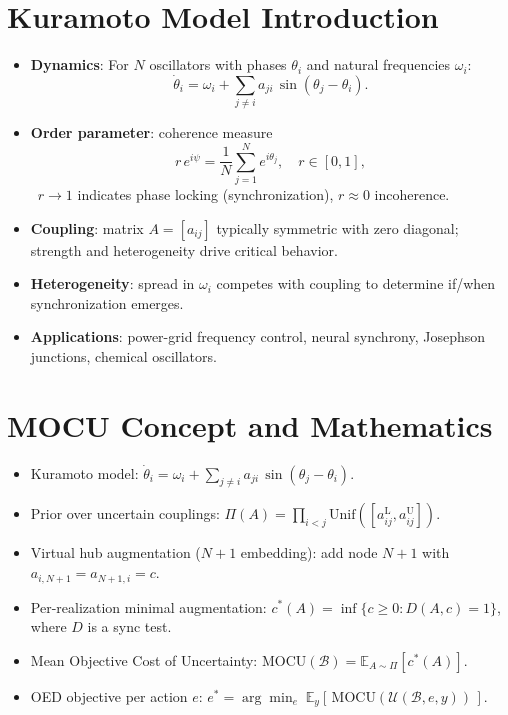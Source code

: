 \documentclass[11pt]{article}
\begin{document}
\newpage\section*{Kuramoto Model Introduction}
\begin{itemize}
\item \textbf{Dynamics}: For $N$ oscillators with phases $\theta_i$ and natural frequencies $\omega_i$:
\[ \dot{\theta}_i = \omega_i + \sum_{j\ne i} a_{ji} \, \sin(\theta_j - \theta_i). \]
\item \textbf{Order parameter}: coherence measure
\[ r \, e^{i\psi} = \frac{1}{N} \sum_{j=1}^{N} e^{i\theta_j}, \quad r\in[0,1], \]\
$r\to 1$ indicates phase locking (synchronization), $r\approx 0$ incoherence.
\item \textbf{Coupling}: matrix $A=[a_{ij}]$ typically symmetric with zero diagonal; strength and heterogeneity drive critical behavior.
\item \textbf{Heterogeneity}: spread in $\omega_i$ competes with coupling to determine if/when synchronization emerges.
\item \textbf{Applications}: power-grid frequency control, neural synchrony, Josephson junctions, chemical oscillators.
\end{itemize}

\newpage\section*{MOCU Concept and Mathematics}
\begin{itemize}
\item Kuramoto model: \(\dot{\theta}_i = \omega_i + \sum_{j\ne i} a_{ji}\,\sin(\theta_j-\theta_i)\).
\item Prior over uncertain couplings: \(\Pi(A)=\prod_{i<j}\mathrm{Unif}([a^{\mathrm{L}}_{ij},a^{\mathrm{U}}_{ij}])\).
\item Virtual hub augmentation (\(N{+}1\) embedding): add node $N{+}1$ with \(a_{i,N+1}=a_{N+1,i}=c\).
\item Per-realization minimal augmentation: \(c^*(A)=\inf\{c\ge 0: D(A,c)=1\}\), where $D$ is a sync test.
\item Mean Objective Cost of Uncertainty: \(\mathrm{MOCU}(\mathcal{B})=\mathbb{E}_{A\sim\Pi}[c^*(A)]\).
\item OED objective per action $e$: \(e^* = \arg\min_e\; \mathbb{E}_{y}[\, \mathrm{MOCU}(\mathcal{U}(\mathcal{B},e,y)) \,]\).
\end{itemize}
\end{document}
